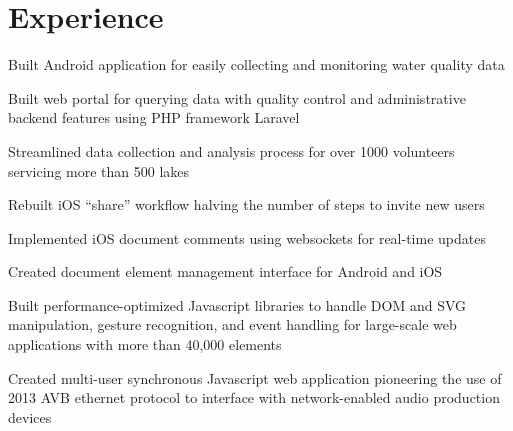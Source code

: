 \documentclass[letterpaper]{deedy-resume} %
\begin{document}
\begin{minipage}[t]{0.66\textwidth} %


\section{Experience}


\vspace{\topsep} %
\begin{tightitemize}
\item Built Android application for easily collecting and monitoring water quality data
\item Built web portal for querying data with quality control and administrative backend features using PHP framework Laravel
\item Streamlined data collection and analysis process for over 1000 volunteers servicing more than 500 lakes

\end{tightitemize}

\sectionspace %



\begin{tightitemize}
\item Rebuilt iOS ``share'' workflow halving the number of steps to invite new users
\item Implemented iOS document comments using websockets for real-time updates 
\item Created document element management interface for Android and iOS
\end{tightitemize}

\sectionspace %



\begin{tightitemize}
\item Built performance-optimized Javascript libraries to handle DOM and SVG manipulation, gesture recognition, and event handling for large-scale web applications with more than 40,000 elements
\item Created multi-user synchronous Javascript web application pioneering the use of 2013 AVB ethernet protocol to interface with network-enabled audio production devices
\end{tightitemize}


\end{minipage}
\end{document}
